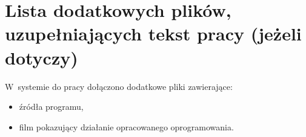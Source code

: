\chapter{Lista dodatkowych plików, uzupełniających tekst pracy (jeżeli dotyczy)}

W~systemie do pracy dołączono dodatkowe pliki zawierające:
\begin{itemize}
    \item źródła programu,
    \item film pokazujący działanie opracowanego oprogramowania.
\end{itemize}
